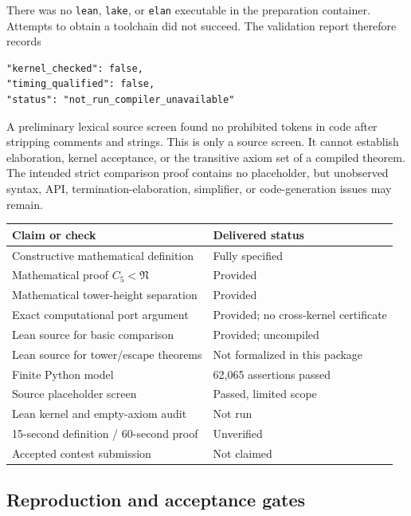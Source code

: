 \documentclass[11pt]{article}
\theoremstyle{definition}
\newcommand{\Entry}{\mathfrak N}
\newcommand{\Cfive}{C_5}
\newcommand{\code}[1]{\texttt{#1}}
\begin{document}
There was no \code{lean}, \code{lake}, or \code{elan} executable in the
preparation container. Attempts to obtain a toolchain did not succeed.
The validation report therefore records
\begin{lstlisting}
"kernel_checked": false,
"timing_qualified": false,
"status": "not_run_compiler_unavailable"
\end{lstlisting}
A preliminary lexical source screen found no prohibited tokens in code after
stripping comments and strings. This is only a source screen. It cannot
establish elaboration, kernel acceptance, or the transitive axiom set of a
compiled theorem. The intended strict comparison proof contains no
placeholder, but unobserved syntax, API, termination-elaboration, simplifier,
or code-generation issues may remain.

\begin{center}
\begin{tabular}{p{.56\linewidth}p{.34\linewidth}}
\toprule
Claim or check & Delivered status\\
\midrule
Constructive mathematical definition & Fully specified\\
Mathematical proof $\Cfive<\Entry$ & Provided\\
Mathematical tower-height separation & Provided\\
Exact computational port argument & Provided; no cross-kernel certificate\\
Lean source for basic comparison & Provided; uncompiled\\
Lean source for tower/escape theorems & Not formalized in this package\\
Finite Python model & 62,065 assertions passed\\
Source placeholder screen & Passed, limited scope\\
Lean kernel and empty-axiom audit & Not run\\
15-second definition / 60-second proof & Unverified\\
Accepted contest submission & Not claimed\\
\bottomrule
\end{tabular}
\end{center}

\subsection{Reproduction and acceptance gates}
\end{document}
